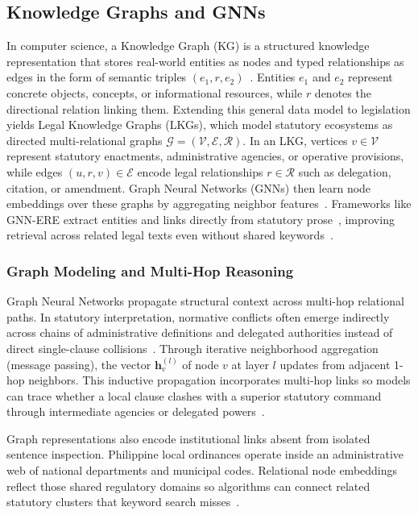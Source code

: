     \subsection{Knowledge Graphs and GNNs}
    In computer science, a Knowledge Graph (KG) is a structured knowledge representation that stores real-world entities as nodes and typed relationships as edges in the form of semantic triples $(e_1, r, e_2)$~\cite{li2024construction}. Entities $e_1$ and $e_2$ represent concrete objects, concepts, or informational resources, while $r$ denotes the directional relation linking them. Extending this general data model to legislation yields Legal Knowledge Graphs (LKGs), which model statutory ecosystems as directed multi-relational graphs $\mathcal{G} = (\mathcal{V}, \mathcal{E}, \mathcal{R})$. In an LKG, vertices $v \in \mathcal{V}$ represent statutory enactments, administrative agencies, or operative provisions, while edges $(u, r, v) \in \mathcal{E}$ encode legal relationships $r \in \mathcal{R}$ such as delegation, citation, or amendment. Graph Neural Networks (GNNs) then learn node embeddings over these graphs by aggregating neighbor features~\cite{ma2025gnn, yang2021legalgnn}. Frameworks like GNN-ERE extract entities and links directly from statutory prose~\cite{ma2025gnn}, improving retrieval across related legal texts even without shared keywords~\cite{harde2025lecnet}.

        \subsubsection{Graph Modeling and Multi-Hop Reasoning}
        Graph Neural Networks propagate structural context across multi-hop relational paths. In statutory interpretation, normative conflicts often emerge indirectly across chains of administrative definitions and delegated authorities instead of direct single-clause collisions~\cite{yang2021legalgnn}. Through iterative neighborhood aggregation (message passing), the vector $\mathbf{h}_v^{(l)}$ of node $v$ at layer $l$ updates from adjacent 1-hop neighbors. This inductive propagation incorporates multi-hop links so models can trace whether a local clause clashes with a superior statutory command through intermediate agencies or delegated powers~\cite{ma2025gnn}.

        Graph representations also encode institutional links absent from isolated sentence inspection. Philippine local ordinances operate inside an administrative web of national departments and municipal codes. Relational node embeddings reflect those shared regulatory domains so algorithms can connect related statutory clusters that keyword search misses~\cite{ma2025gnn}.

